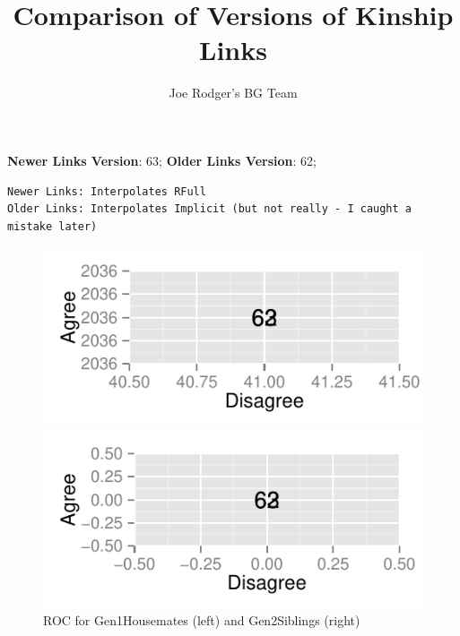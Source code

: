 \documentclass[a4paper]{article}\usepackage{graphicx, color}
\title{Comparison of Versions of Kinship Links}
\author{Joe Rodger's BG Team}
\makeatletter
\def\maxwidth{ %
  \ifdim\Gin@nat@width>\linewidth
    \linewidth
  \else
    \Gin@nat@width
  \fi
}
\newenvironment{kframe}{%
 \def\at@end@of@kframe{}%
 \ifinner\ifhmode%
  \def\at@end@of@kframe{\end{minipage}}%
  \begin{minipage}{\columnwidth}%
 \fi\fi%
 \def\FrameCommand##1{\hskip\@totalleftmargin \hskip-\fboxsep
 \colorbox{shadecolor}{##1}\hskip-\fboxsep
     \hskip-\linewidth \hskip-\@totalleftmargin \hskip\columnwidth}%
 \MakeFramed {\advance\hsize-\width
   \@totalleftmargin\z@ \linewidth\hsize
   \@setminipage}}%
 {\par\unskip\endMakeFramed%
 \at@end@of@kframe}
\newenvironment{knitrout}{}{} %
\makeatother
\begin{document}
\maketitle

\setlength{\parindent}{0pt}%







\textbf{Newer Links Version}: 63;
\textbf{Older Links Version}: 62;

\begin{knitrout}
\color{fgcolor}\begin{kframe}
\begin{verbatim}
Newer Links: Interpolates RFull
Older Links: Interpolates Implicit (but not really - I caught a mistake later)
\end{verbatim}
\end{kframe}
\end{knitrout}


\begin{figure}[htbp]
\begin{knitrout}
\color{fgcolor}
\includegraphics[width=\maxwidth]{figure/unnamed-chunk-31} 

\includegraphics[width=\maxwidth]{figure/unnamed-chunk-32} 

\end{knitrout}

\caption{ROC for Gen1Housemates (left) and Gen2Siblings (right)}
\end{figure}
\end{document}

